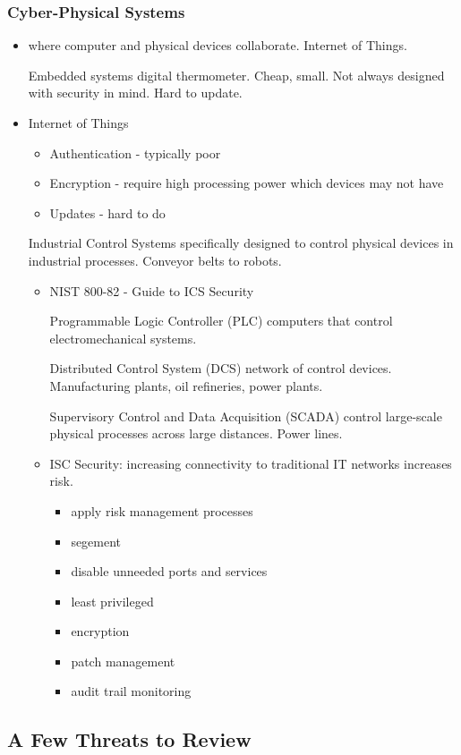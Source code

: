 \documentclass[11pt]{article}
\begin{document}
\subsubsection{Cyber-Physical Systems}
\label{sec:orgd7fa085}
\begin{itemize}
\item where computer and physical devices collaborate. Internet of Things.
\item[{Embedded systems}] digital thermometer. Cheap, small. Not always designed with security in mind. Hard to update.
\item Internet of Things
\begin{itemize}
\item Authentication - typically poor
\item Encryption - require high processing power which devices may not have
\item Updates - hard to do
\end{itemize}
\item[{Industrial Control Systems}] specifically designed to control physical devices in industrial processes. Conveyor belts to robots.
\begin{itemize}
\item NIST 800-82 - Guide to ICS Security
\item[{Programmable Logic Controller (PLC)}] computers that control electromechanical systems.
\item[{Distributed Control System (DCS)}] network of control devices. Manufacturing plants, oil refineries, power plants.
\item[{Supervisory Control and Data Acquisition (SCADA)}] control large-scale physical processes across large distances. Power lines.
\item ISC Security: increasing connectivity to traditional IT networks increases risk.
\begin{itemize}
\item apply risk management processes
\item segement
\item disable unneeded ports and services
\item least privileged
\item encryption
\item patch management
\item audit trail monitoring
\end{itemize}
\end{itemize}
\end{itemize}
\subsection{A Few Threats to Review}
\label{sec:orgf1fa0cb}
\end{document}
